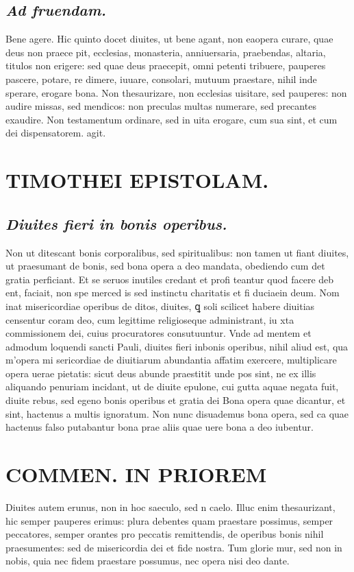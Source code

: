\documentclass{article}
\begin{document}
\begin{pages}
\subsection*{\textit{Ad fruendam. }}\pstart Bene agere. Hic quinto docet diuites, ut bene agant, non eaopera curare, quae deus non praece pit, ecclesias, monasteria, anniuersaria, praebendas, altaria, titulos non erigere: sed quae deus praecepit, omni petenti tribuere, pauperes pascere, potare, re dimere, iuuare, consolari, mutuum praestare, nihil inde sperare, erogare bona. Non thesaurizare, non ecclesias uisitare, sed pauperes: non audire missas, sed mendicos: non preculas multas numerare, sed precantes exaudire. Non testamentum ordinare, sed in uita erogare, cum sua sint, et cum dei dispensatorem. agit.  \pend
\section*{TIMOTHEI EPISTOLAM. }
\marginpar{[ p.183 ]}
{}
\subsection*{\textit{Diuites fieri in bonis operibus. }}\pstart Non ut ditescant bonis corporalibus, sed spiritualibus: non tamen ut fiant diuites, ut praesumant de bonis, sed bona opera a deo mandata, obediendo cum det gratia perficiant. Et se seruos inutiles credant et profi teantur quod facere deb ent, faciait, non spe merced is sed instinctu charitatis et fi duciaein deum. Nom inat misericordiae operibus de ditos, diuites, ꝗ soli scilicet habere diuitias censentur coram deo, cum legittime religioseque administrant, iu xta commissionem dei, cuius procuratores consutuuntur. Vnde ad mentem et admodum loquendi sancti Pauli, diuites fieri inbonis operibus, nihil aliud est, qua m'opera mi sericordiae de diuitiarum abundantia affatim exercere, multiplicare opera uerae pietatis: sicut deus abunde praestitit unde pos sint, ne ex illis aliquando penuriam incidant, ut de diuite epulone, cui gutta aquae negata fuit, diuite rebus, sed egeno bonis operibus et gratia dei  \pend\pstart Bona opera quae dicantur, et sint, hactenus a multis ignoratum. Non nunc disuademus bona opera, sed ca quae hactenus falso putabantur bona prae aliis quae uere bona a deo iubentur.  \pend
\section*{COMMEN. IN PRIOREM }
\marginpar{[ p.184 ]}\pstart Diuites autem erunus, non in hoc saeculo, sed n caelo. Illuc enim thesaurizant, hic semper pauperes erimus: plura debentes quam praestare possimus, semper peccatores, semper orantes pro peccatis remittendis, de operibus bonis nihil praesumentes: sed de misericordia dei et fide nostra. Tum glorie mur, sed non in nobis, quia nec fidem praestare possumus, nec opera nisi deo dante.  \pend
{}
{}

\end{pages}
\end{document}
